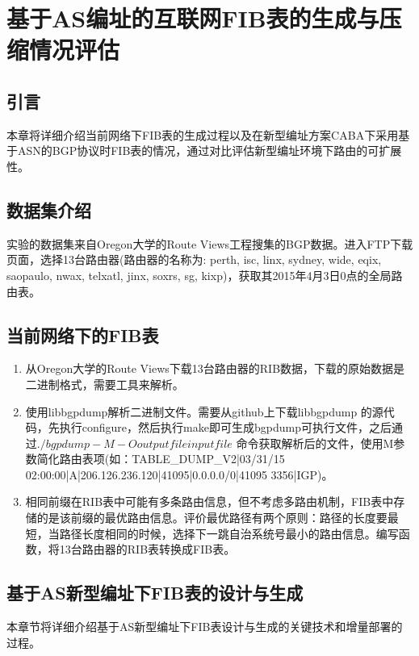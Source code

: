

\chapter{基于AS编址的互联网FIB表的生成与压缩情况评估}
\label{dctg}
\section{引言}
本章将详细介绍当前网络下FIB表的生成过程以及在新型编址方案CABA下采用基于ASN的BGP协议时FIB表的情况，通过对比评估新型编址环境下路由的可扩展性。
\section{数据集介绍}
实验的数据集来自Oregon大学的Route Views工程搜集的BGP数据。进入FTP下载页面，选择13台路由器(路由器的名称为: perth, isc, linx, sydney, wide, eqix, saopaulo, nwax, telxatl, jinx, soxrs, sg, kixp)，获取其2015年4月3日0点的全局路由表。

\section{当前网络下的FIB表}

\begin{enumerate}
\item 从Oregon大学的Route Views下载13台路由器的RIB数据，下载的原始数据是二进制格式，需要工具来解析。
\item 使用libbgpdump解析二进制文件。需要从github上下载libbgpdump 的源代码，先执行configure，然后执行make即可生成bgpdump可执行文件，之后通过$./bgpdump -M -O outputfile inputfile$ 命令获取解析后的文件，使用M参数简化路由表项(如：TABLE\_DUMP\_V2|03/31/15 02:00:00|A|206.126.236.120|41095|0.0.0.0/0|41095 3356|IGP)。
\item 相同前缀在RIB表中可能有多条路由信息，但不考虑多路由机制，FIB表中存储的是该前缀的最优路由信息。评价最优路径有两个原则：路径的长度要最短，当路径长度相同的时候，选择下一跳自治系统号最小的路由信息。编写函数，将13台路由器的RIB表转换成FIB表。
\end{enumerate}

\section{基于AS新型编址下FIB表的设计与生成}
本章节将详细介绍基于AS新型编址下FIB表设计与生成的关键技术和增量部署的过程。
